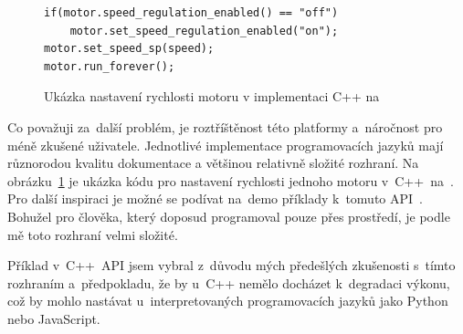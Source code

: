 % 
% 
% 
% 
% 

\begin{figure}[H] 
	\begin{verbatim}
if(motor.speed_regulation_enabled() == "off")
    motor.set_speed_regulation_enabled("on");
motor.set_speed_sp(speed);
motor.run_forever();
	\end{verbatim}
	\caption{Ukázka nastavení rychlosti motoru v implementaci C++ na \evThreeDev}
	\label{src:ev3dev-lang-cpp_drive-test}
\end{figure}

Co považuji za~další problém, je roztříštěnost této platformy a~náročnost pro méně zkušené uživatele. 
Jednotlivé implementace programovacích jazyků mají různorodou kvalitu dokumentace a většinou relativně složité rozhraní. 
Na obrázku~\ref{src:ev3dev-lang-cpp_drive-test} je ukázka kódu pro nastavení rychlosti jednoho motoru v~C++~na~\evThreeDev{}. 
Pro další inspiraci je možné se podívat na~demo příklady k~tomuto API~\cite{legoMindstormsEV3_ev3dev-lang-cpp_drive-test}.
Bohužel pro člověka, který doposud programoval pouze přes \lego{} prostředí, je podle mě toto rozhraní velmi složité.

Příklad v~C++~API jsem vybral z~důvodu mých předešlých zkušenosti s~tímto rozhraním a~předpokladu, že by u~C++ nemělo docházet k~degradaci výkonu, což by mohlo nastávat u~interpretovaných programovacích jazyků jako Python nebo JavaScript.
% 
% 
% 
% 
%
%
%
%
% 

